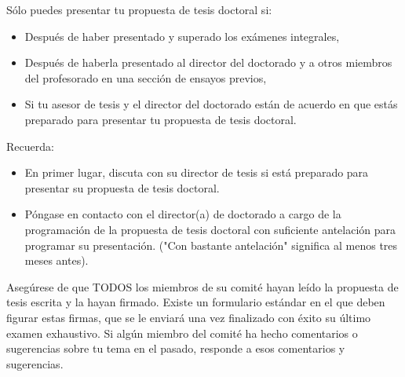 Sólo puedes presentar tu propuesta de tesis doctoral si:
\begin{itemize}
    \item Después de haber presentado y superado los exámenes integrales,
    \item Después de haberla presentado al director del doctorado y a otros miembros del profesorado en una sección de ensayos previos,
    \item Si tu asesor de tesis y el director del doctorado están de acuerdo en que estás preparado para presentar tu propuesta de tesis doctoral.
\end{itemize}

Recuerda: 
\begin{itemize}
\item En primer lugar, discuta con su director de tesis si está preparado para presentar su propuesta de tesis doctoral.

\item Póngase en contacto con el director(a) de doctorado a cargo de la programación de la propuesta de tesis doctoral con suficiente antelación para programar su presentación. ("Con bastante antelación" significa al menos tres meses antes).
\end{itemize}

Asegúrese de que TODOS los miembros de su comité hayan leído la propuesta de tesis escrita y la hayan firmado. Existe un formulario estándar en el que deben figurar estas firmas, que se le enviará una vez finalizado con éxito su último examen exhaustivo. Si algún miembro del comité ha hecho comentarios o sugerencias sobre tu tema en el pasado, responde a esos comentarios y sugerencias.